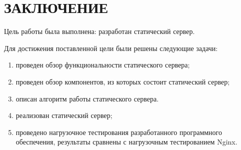 \chapter*{ЗАКЛЮЧЕНИЕ}

Цель работы была выполнена: разработан статический сервер.

Для достижения поставленной цели были решены следующие задачи:

\begin{enumerate}
	\item проведен обзор функциональности статического сервера;
	\item проведен обзор компонентов, из которых состоит статический сервер;
	\item описан алгоритм работы статического сервера.
	\item реализован статический сервер;
	\item проведено нагрузочное тестирования разработанного программного обеспечения, результаты сравнены с нагрузочным тестированием Nginx.
\end{enumerate}